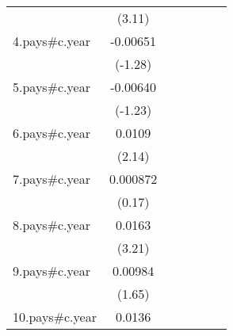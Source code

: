{\begin{tabular}{l*{6}{c}}
                    &      (3.11)         &                     &                     &                     &                     &                     \\
[1em]
4.pays#c.year       &    -0.00651         &                     &                     &                     &                     &                     \\
                    &     (-1.28)         &                     &                     &                     &                     &                     \\
[1em]
5.pays#c.year       &    -0.00640         &                     &                     &                     &                     &                     \\
                    &     (-1.23)         &                     &                     &                     &                     &                     \\
[1em]
6.pays#c.year       &      0.0109\sym{*}  &                     &                     &                     &                     &                     \\
                    &      (2.14)         &                     &                     &                     &                     &                     \\
[1em]
7.pays#c.year       &    0.000872         &                     &                     &                     &                     &                     \\
                    &      (0.17)         &                     &                     &                     &                     &                     \\
[1em]
8.pays#c.year       &      0.0163\sym{**} &                     &                     &                     &                     &                     \\
                    &      (3.21)         &                     &                     &                     &                     &                     \\
[1em]
9.pays#c.year       &     0.00984         &                     &                     &                     &                     &                     \\
                    &      (1.65)         &                     &                     &                     &                     &                     \\
[1em]
10.pays#c.year      &      0.0136\sym{*}  &                     &                     &                     &                     &                     \\

\end{tabular}}
